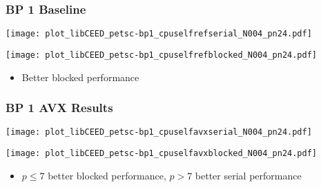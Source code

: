 \documentclass{beamer}
\begin{document}

\begin{frame}
\begin{center}
\frametitle{BP 1 Baseline}

\begin{multicols}{2}

\begin{flushleft}
\texttt{[image: plot\_libCEED\_petsc-bp1\_cpuselfrefserial\_N004\_pn24.pdf]}
\end{flushleft}

\begin{flushright}
\texttt{[image: plot\_libCEED\_petsc-bp1\_cpuselfrefblocked\_N004\_pn24.pdf]}
\end{flushright}

\end{multicols}

\vspace{-0.15cm}

\begin{itemize}

\item Better blocked performance

\end{itemize}

\end{center}
\end{frame}


\begin{frame}
\begin{center}
\frametitle{BP 1 AVX Results}

\begin{multicols}{2}

\begin{flushleft}
\texttt{[image: plot\_libCEED\_petsc-bp1\_cpuselfavxserial\_N004\_pn24.pdf]}
\end{flushleft}

\begin{flushright}
\texttt{[image: plot\_libCEED\_petsc-bp1\_cpuselfavxblocked\_N004\_pn24.pdf]}
\end{flushright}

\end{multicols}

\vspace{-0.15cm}

\begin{itemize}

\item $p \leq 7$ better blocked performance, $p > 7$ better serial performance

\end{itemize}

\end{center}
\end{frame}
\end{document}
